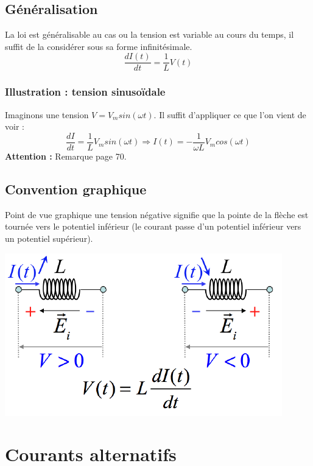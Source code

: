 \documentclass	[11pt, a4paper, openany]{book}
\begin{document}
\subsection{Généralisation}
La loi est généralisable au cas ou la tension est variable au cours du temps, il suffit de la considérer sous sa forme infinitésimale.
\begin{equation}
	\frac{dI(t)}{dt} = \frac{1}{L}V(t)
\end{equation}

\subsubsection*{Illustration : tension sinusoïdale}
Imaginons une tension $V = V_m sin(\omega t)$. Il suffit d'appliquer ce que l'on vient de voir : 
\begin{equation}
	\frac{dI}{dt} = \frac{1}{L}V_m sin(\omega t) \Rightarrow I(t) = -\frac{1}{\omega L}V_m cos(\omega t)
\end{equation}
\textbf{Attention :} Remarque page 70.
\subsection{Convention graphique}
Point
de vue graphique une tension négative signifie que la pointe de la flèche est tournée
vers le potentiel inférieur (le courant passe d’un potentiel inférieur vers un potentiel
supérieur).

\begin{center}
	\includegraphics[scale=0.45]{em/image24.png}\\
\end{center}

\section{Courants alternatifs}
\end{document}
